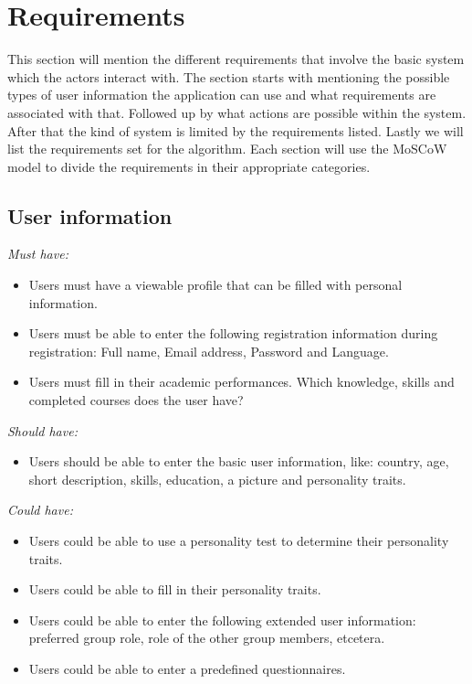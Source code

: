 \documentclass[]{article}
\newcommand{\reqr}[1]{{\noindent\emph{#1:}}}
\begin{document}
\section{Requirements}
This section will mention the different requirements that involve the basic system which the actors interact with.
The section starts with mentioning the possible types of user information the application can use and what requirements are associated with that.
Followed up by what actions are possible within the system.
After that the kind of system is limited by the requirements listed.
Lastly we will list the requirements set for the algorithm.
Each section will use the MoSCoW model to divide the requirements in their appropriate categories.


\subsection{User information}
\reqr{Must have}
\begin{itemize}
\item Users must have a viewable profile that can be filled with personal information.
\item Users must be able to enter the following registration information during registration: Full name, Email address, Password and Language.
\item Users must fill in their academic performances. Which knowledge, skills and completed courses does the user have?
\end{itemize}

\reqr{Should have}
\begin{itemize}
\item Users should be able to enter the basic user information, like: country, age, short description, skills, education, a picture and personality traits.
\end{itemize}

\reqr{Could have}
\begin{itemize}
\item Users could be able to use a personality test to determine their personality traits.
\item Users could be able to fill in their personality traits.
\item Users could be able to enter the following extended user information: preferred group role, role of the other group members, etcetera.
\item Users could be able to enter a predefined questionnaires.
\end{itemize}
\end{document}
